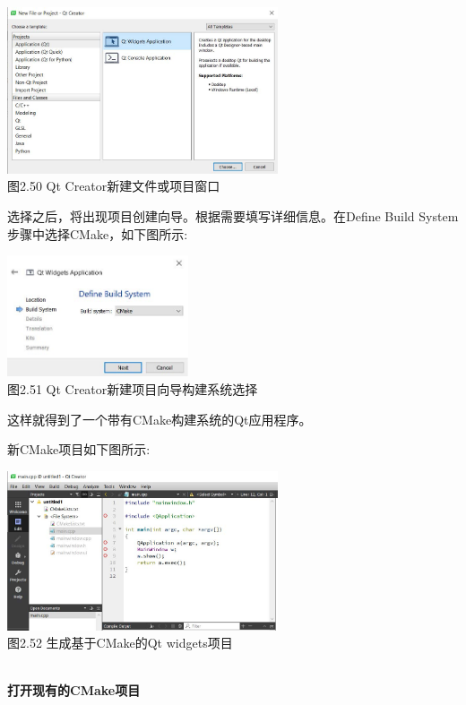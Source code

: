 \begin{center}
\includegraphics[width=0.6\textwidth]{content/1/chapter2/images/50.jpg}\\
图2.50  Qt Creator新建文件或项目窗口
\end{center}

选择之后，将出现项目创建向导。根据需要填写详细信息。在Define Build System步骤中选择CMake，如下图所示:

\begin{center}
\includegraphics[width=0.4\textwidth]{content/1/chapter2/images/51.jpg}\\
图2.51  Qt Creator新建项目向导构建系统选择
\end{center}

这样就得到了一个带有CMake构建系统的Qt应用程序。

新CMake项目如下图所示:

\begin{center}
\includegraphics[width=0.6\textwidth]{content/1/chapter2/images/52.jpg}\\
图2.52 生成基于CMake的Qt widgets项目
\end{center}

\hspace*{\fill} \\ %
\noindent
\textbf{打开现有的CMake项目}

